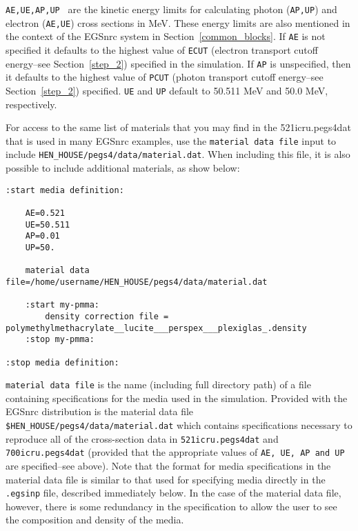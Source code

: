 \begin{description}
\item {\tt AE,UE,AP,UP } are the kinetic energy limits for calculating photon ({\tt AP,UP}) and electron ({\tt AE,UE}) cross sections in
MeV.  These energy limits are also mentioned in the context of the EGSnrc system in Section~\ref{common_blocks}.
If {\tt AE} is
not specified it defaults to the highest value of {\tt ECUT} (electron transport cutoff energy--see Section~\ref{step_2}) specified
in the simulation.  If
{\tt AP} is unspecified, then it defaults to the highest value of {\tt PCUT} (photon transport cutoff energy--see Section~\ref{step_2})
specified.  {\tt UE} and {\tt UP} default to 50.511 MeV and 50.0 MeV, respectively.

For access to the same list of materials that you may find in the 521icru.pegs4dat that is used in many EGSnrc examples, use the {\tt material data file} input to include {\tt HEN_HOUSE/pegs4/data/material.dat}. When including this file, it is also possible to include additional materials, as show below:

\begin{verbatim}
:start media definition:

    AE=0.521
    UE=50.511
    AP=0.01
    UP=50.

    material data file=/home/username/HEN_HOUSE/pegs4/data/material.dat

    :start my-pmma:
        density correction file = polymethylmethacrylate__lucite___perspex___plexiglas_.density
    :stop my-pmma:

:stop media definition:
\end{verbatim}

\item {\tt material data file} is the name (including full directory path) of a file containing specifications for the media used
in the simulation.  Provided with the EGSnrc distribution is the material data file {\tt \$HEN\_HOUSE/pegs4/data/material.dat} which
contains specifications necessary to reproduce all of the cross-section data in {\tt 521icru.pegs4dat} and {\tt 700icru.pegs4dat}
(provided that the appropriate values of {\tt AE, UE, AP and UP} are specified--see above).  Note that the format for
media specifications in the material data file is similar to that used for specifying media directly in the
{\tt .egsinp} file, described immediately below.  In the case of the material data file, however, there is some redundancy in the specification to allow the
user to see the composition and density of the media.


\end{description}
